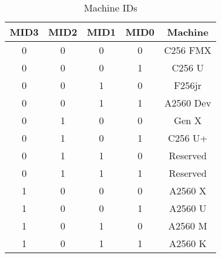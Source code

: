 \begin{table}[ht]
    \begin{center}
        \begin{tabular}{|c|c|c|c|c|} \hline
            MID3 & MID2 & MID1 & MID0 & Machine \\\hline\hline
            0 & 0 & 0 & 0 & C256 FMX \\ \hline
            0 & 0 & 0 & 1 & C256 U \\ \hline
            0 & 0 & 1 & 0 & F256jr \\ \hline
            0 & 0 & 1 & 1 & A2560 Dev \\ \hline
            0 & 1 & 0 & 0 & Gen X \\ \hline
            0 & 1 & 0 & 1 & C256 U+ \\ \hline
            0 & 1 & 1 & 0 & Reserved \\ \hline
            0 & 1 & 1 & 1 & Reserved \\ \hline
            1 & 0 & 0 & 0 & A2560 X \\ \hline
            1 & 0 & 0 & 1 & A2560 U \\ \hline
            1 & 0 & 1 & 0 & A2560 M \\ \hline
            1 & 0 & 1 & 1 & A2560 K \\ \hline
        \end{tabular}
    \end{center}
    \caption{Machine IDs}
    \label{tab:machine_ids}
\end{table}
